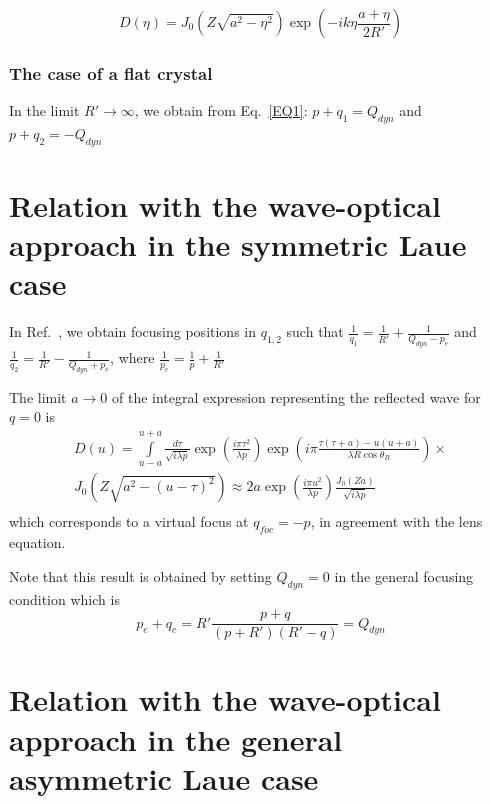\documentclass{iucr}              %
\begin{document}
\begin{equation}
\label{EQ4}
D(\eta ) = {J_0}(Z\sqrt {{a^2} - {\eta ^2}} )\exp ( - ik\eta \frac{{a + \eta }}{{2R'}})
\end{equation}

\subsubsection{The case of a flat crystal}
In the limit  $R' \to \infty $, we obtain from Eq.~\ref{EQ1}:  $p + {q_1} = {Q_{dyn}}$  and $p + {q_2} =  - {Q_{dyn}}$


\section{Relation with the wave-optical approach in the symmetric Laue case}

In Ref.~\cite{GuigayFerrero2012}, we obtain focusing positions in  $q_{1,2}$ such that   $\frac{1}{{{q_1}}} = \frac{1}{{R'}} + \frac{1}{{{Q_{dyn}} - {p_e}}}$  and  $\frac{1}{{{q_2}}} = \frac{1}{{R'}} - \frac{1}{{{Q_{dyn}} + {p_e}}}$, where  $\frac{1}{{{p_e}}} = \frac{1}{p} + \frac{1}{{R'}}$ 

The limit $a \to 0$  of the integral expression representing the reflected wave for  $q=0$ is
\begin{multline}
D(u) = \int\limits_{u - a}^{u + a} {\frac{{d\tau }}{{\sqrt {i\lambda p} }}} \exp (\frac{{i\pi {\tau ^2}}}{{\lambda p}})\exp (i\pi \frac{{\tau (\tau  + a) - u(u + a)}}{{\lambda R\cos {\theta _B}}}) \times \\
{J_0}(Z\sqrt {{a^2} - {{(u - \tau )}^2}} ) \approx 2a\exp (\frac{{i\pi {u^2}}}{{\lambda p}})\frac{{{J_0}(Za)}}{{\sqrt {i\lambda p} }}\\
\end{multline}
 which corresponds to a virtual focus at  $q_{foc}=-p$, in agreement with the lens equation.
 
Note that this result is obtained by setting ${Q_{dyn}} = 0$  in the general focusing condition which is 
\begin{equation}
{p_e} + {q_e} = R'\frac{{p + q}}{{(p + R')(R' - q)}} = {Q_{dyn}}
\end{equation}


\section{Relation with the wave-optical approach in the general asymmetric Laue case}
\end{document}
